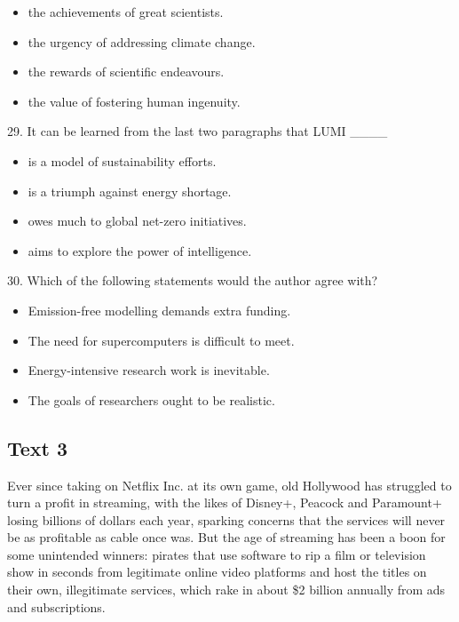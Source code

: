 \documentclass[UTF8,11pt]{ctexart}
\begin{document}
\begin{itemize}[leftmargin=2em,itemsep=.2em,topsep=.4em]\item[A.] the achievements of great scientists.
\item[B.] the urgency of addressing climate change.
\item[C.] the rewards of scientific endeavours.
\item[D.] the value of fostering human ingenuity.
\end{itemize}

29. It can be learned from the last two paragraphs that LUMI \_\_\_\_


\begin{itemize}[leftmargin=2em,itemsep=.2em,topsep=.4em]\item[A.] is a model of sustainability efforts.
\item[B.] is a triumph against energy shortage.
\item[C.] owes much to global net-zero initiatives.
\item[D.] aims to explore the power of intelligence.
\end{itemize}

30. Which of the following statements would the author agree with?


\begin{itemize}[leftmargin=2em,itemsep=.2em,topsep=.4em]\item[A.] Emission-free modelling demands extra funding.
\item[B.] The need for supercomputers is difficult to meet.
\item[C.] Energy-intensive research work is inevitable.
\item[D.] The goals of researchers ought to be realistic.
\end{itemize}

\subsection*{\textbf{Text 3}}


Ever since taking on Netflix Inc. at its own game, old Hollywood has struggled to turn a profit in streaming, with the likes of Disney+, Peacock and Paramount+ losing billions of dollars each year, sparking concerns that the services will never be as profitable as cable once was. But the age of streaming has been a boon for some unintended winners: pirates that use software to rip a film or television show in seconds from legitimate online video platforms and host the titles on their own, illegitimate services, which rake in about \$2 billion annually from ads and subscriptions.
\end{document}
